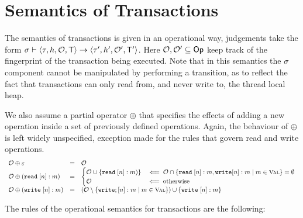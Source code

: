 \documentclass[a4paper,UKenglish]{article}%
\theoremstyle{plain}
\begin{document}
\section{Semantics of Transactions}
The semantics of transactions is given in an operational way, 
judgements take the form $\sigma \vdash \langle \tau, h, \mathcal{O}, \mathsf{T} \rangle 
\to \langle \tau', h', \mathcal{O}', \mathsf{T}' \rangle$. Here $\mathcal{O}, \mathcal{O}' \subseteq \mathsf{Op}$ 
keep track of the fingerprint of the transaction being executed. Note that in this semantics 
the $\sigma$ component cannot be manipulated by performing a transition, as to reflect 
the fact that transactions can only read from, and never write to, the thread local heap.

We also assume a partial operator $\oplus$ that specifies the effects of adding a new operation inside 
a set of previously defined operations. Again, the behaviour of $\oplus$ is left widely unspecified, 
exception made for the rules that govern read and write operations.
\[
\begin{array}{lcl}
\mathcal{O} \oplus \varepsilon &=& \mathcal{O}\\
\mathcal{O} \oplus (\RD\;[n]: m) &=&
\begin{cases}
\mathcal{O} \cup \{\RD\; [n]: m)\} & \impliedby \mathcal{O} \cap \{ \RD\;[n]: m, \WR [n]: m \mid m \in \Val\} = \emptyset\\
\mathcal{O} & \impliedby \text{otherwise}
\end{cases}\\
\mathcal{O} \oplus (\WR\;[n]: m) &=& 
(\mathcal{O} \setminus \{ \WR;[n] : m \mid m \in \Val \}) \cup \{\WR\;[n]: m \}
\end{array}
\]

The rules of the operational semantics for transactions are the following: 
\end{document}
